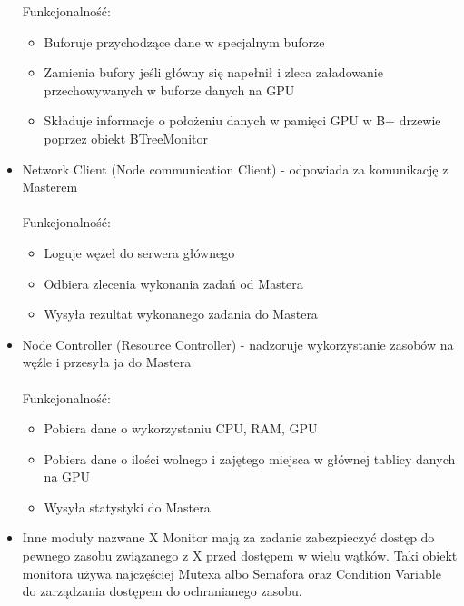 \documentclass[paper=a4, fontsize=11pt]{scrartcl} %
\numberwithin{equation}{section} %
\numberwithin{figure}{section} %
\numberwithin{table}{section} %
\begin{document}
\begin{itemize}
				Funkcjonalność: 
				\begin{itemize}
					\item Buforuje przychodzące dane w specjalnym buforze
					\item Zamienia bufory jeśli główny się napełnił i zleca załadowanie przechowywanych w buforze danych na GPU
					\item Składuje informacje o położeniu danych w pamięci GPU w B+ drzewie poprzez obiekt BTreeMonitor
				\end{itemize}
			\item Network Client (Node communication Client) - odpowiada za komunikację z Masterem \\ \\
				Funkcjonalność: 
				\begin{itemize}
					\item Loguje węzeł do serwera głównego
					\item Odbiera zlecenia wykonania zadań od Mastera
					\item Wysyła rezultat wykonanego zadania do Mastera
				\end{itemize}
			\item Node Controller (Resource Controller) - nadzoruje wykorzystanie zasobów na węźle i przesyła ja do Mastera \\ \\
				Funkcjonalność: 
				\begin{itemize}
					\item Pobiera dane o wykorzystaniu CPU, RAM, GPU
					\item Pobiera dane o ilości wolnego i zajętego miejsca w głównej tablicy danych na GPU
					\item Wysyła statystyki do Mastera
				\end{itemize}
			\item Inne moduły nazwane X Monitor mają za zadanie zabezpieczyć dostęp do pewnego zasobu związanego z X przed dostępem w wielu wątków. 
				Taki obiekt monitora używa najczęściej Mutexa albo Semafora oraz Condition Variable do zarządzania dostępem do ochranianego zasobu.
		\end{itemize}
\end{document}

